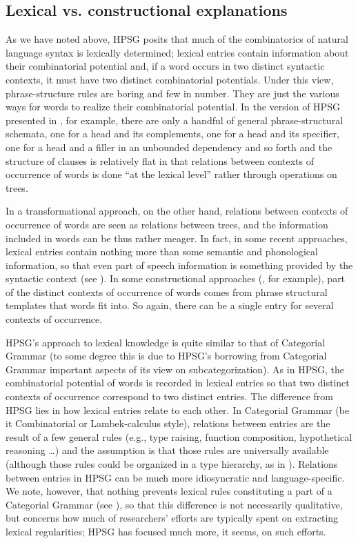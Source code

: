 \documentclass[output=paper]{langsci/langscibook}
\begin{document}
\subsection{Lexical vs. constructional explanations}


As we have noted above, HPSG posits that much of the combinatorics of natural language syntax is lexically determined; lexical entries contain information about their combinatorial potential and, if a word occurs in two distinct syntactic contexts, it must have two distinct combinatorial potentials. Under this view, phrase-structure rules are boring and few in number. They are just the various ways for words to realize their combinatorial potential. In the version of HPSG presented in , for example, there are only a handful of general phrase-structural schemata, one for a head and its complements, one for a head and its specifier, one for a head and a filler in an unbounded dependency and so forth and the structure of clauses is relatively flat in that relations between contexts of occurrence of words is done ``at the lexical level'' rather through operations on trees. 


In a transformational approach, on the other hand, relations between contexts of occurrence of words are seen as relations between trees, and the information included in words can be thus rather meager. In fact, in some recent approaches, lexical entries contain nothing more than some semantic and phonological information, so that even part of speech information is something provided by the syntactic context (see \citealt{Borer2003,Marantz1997}). In some constructional approaches (\citet{Goldberg95a}, for example), part of the distinct contexts of occurrence of words comes from phrase structural templates that words fit into. So again, there can be a single entry for several contexts of occurrence.

HPSG's approach to lexical knowledge is quite similar to that of Categorial Grammar (to some degree this is due to HPSG's borrowing from Categorial Grammar important aspects of its view on subcategorization). As in HPSG, the combinatorial potential of words is recorded in lexical entries so that two distinct contexts of occurrence correspond to two distinct entries. The difference from HPSG lies in how lexical entries relate to each other. In Categorial Grammar (be it Combinatorial or Lambek-calculus style), relations between entries are the result of a few general rules (e.g., type raising, function composition, hypothetical reasoning \ldots) and the assumption is that those rules are universally available (although those rules could be organized in a type hierarchy, as in ). Relations between entries in HPSG can be much more idiosyncratic and language-specific. We note, however, that nothing prevents lexical rules constituting a part of a Categorial Grammar (see \citealt{Carpenter1992b}), so that this difference is not necessarily qualitative, but concerns how much of researchers' efforts are typically spent on extracting lexical regularities; HPSG has focused much more, it seems, on such efforts.
\end{document}
